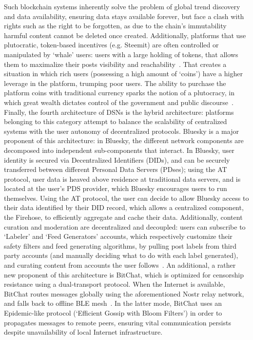 Such blockchain systems inherently solve the problem of global trend discovery and data availability, ensuring data stays available forever, but face a clash with rights such as the right to be forgotten, as due to the chain's immutability harmful content cannot be deleted once created. Additionally, platforms that use plutocratic, token-based incentives (e.g. Steemit) are often controlled or manipulated by `whale' users: users with a large holding of tokens, that allows them to maximalize their posts visibility and reachability~\cite{Jeong2025}. That creates a situation in which rich users (possessing a high amount of `coins') have a higher leverage in the platform, trumping poor users. The ability to purchase the platform coins with traditional currency sparks the notion of a plutocracy, in which great wealth dictates control of the government and public discourse~\cite{Shapiro2026Platforms}.
Finally, the fourth architecture of DSNs is the hybrid architecture: platforms belonging to this category attempt to balance the scalability of centralized systems with the user autonomy of decentralized protocols. Bluesky is a major proponent of this architecture: in Bluesky, the different network components are decomposed into independent sub-components that interact. In Bluesky, user identity is secured via Decentralized Identifiers (DIDs), and can be securely transferred between different Personal Data Servers (PDses); using the AT protocol, user data is heaved above residence at traditional data servers, and is located at the user's PDS provider, which Bluesky encourages users to run themselves. Using the AT protocol, the user can decide to allow Bluesky access to their data identified by their DID record, which allows a centralized component, the Firehose, to efficiently aggregate and cache their data. Additionally, content curation and moderation are decentralized and decoupled: users can subscribe to `Labeler' and `Feed Generators' accounts, which respectively customize their safety filters and feed generating algorithms, by pulling post labels from third party accounts (and manually deciding what to do with each label generated), and curating content from accounts the user follows~\cite{Balduf2024}.
An additional, a rather new proponent of this architecture is BitChat, which is optimized for censorship resistance using a dual-transport protocol. When the Internet is available, BitChat routes messages globally using the aforementioned Nostr relay network, and falls back to offline BLE mesh~\cite{Biagioni2026}. In the latter mode, BitChat uses an Epidemic-like protocol (`Efficient Gossip with Bloom Filters') in order to propagates messages to remote peers, ensuring vital communication persists despite unavailability of local Internet infrastructure.

